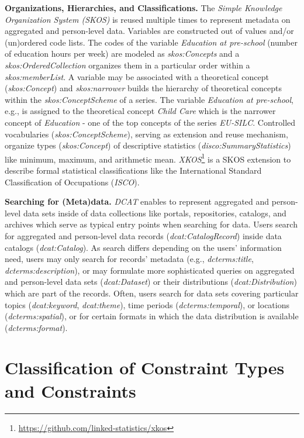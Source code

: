 \documentclass{llncs}
\begin{document}
\textbf{Organizations, Hierarchies, and Classifications.}
The \emph{Simple Knowledge Organization System (SKOS)} is reused multiple times to represent metadata on aggregated and person-level data.
Variables are constructed out of values and/or (un)ordered code lists.
The codes of the variable \emph{Education at pre-school} (number of education hours per week) are modeled as \emph{skos:Concepts} and 
a \emph{skos:OrderedCollection} organizes them in a particular order within a \emph{skos:memberList}.
A variable may be associated with a theoretical concept (\emph{skos:Concept}) and   
\emph{skos:narrower} builds the hierarchy of theoretical concepts within the \emph{skos:ConceptScheme} of a series.
The variable \emph{Education at pre-school}, e.g., is assigned to the theoretical concept \emph{Child Care} which is the narrower concept of \emph{Education} - one of the top concepts of the series \emph{EU-SILC}.
Controlled vocabularies (\emph{skos:ConceptScheme}), serving as extension and reuse mechanism,
organize types (\emph{skos:Concept}) of descriptive statistics (\emph{\emph{disco:SummaryStatistics}}) like minimum, maximum, and arithmetic mean.
\emph{XKOS}\footnote{\url{https://github.com/linked-statistics/xkos}} is a SKOS extension to describe formal statistical classifications like the International Standard Classification of Occupations (\emph{ISCO}). 

\textbf{Searching for (Meta)data.}
\emph{DCAT} enables to represent aggregated and person-level data sets inside of data collections like portals, repositories, catalogs, and archives
which serve as typical entry points when searching for data.
Users search for aggregated and person-level data records (\emph{dcat:CatalogRecord}) inside data catalogs (\emph{dcat:Catalog}). 
As search differs depending on the users’ information need,
users may only search for records' metadata (e.g., \emph{dcterms:title}, \emph{dcterms:description}), 
or may formulate more sophisticated queries on aggregated and person-level data sets (\emph{dcat:Dataset}) or their
distributions (\emph{dcat:Distribution}) which are part of the records. 
Often, users search for data sets covering particular topics (\emph{dcat:keyword}, \emph{dcat:theme}), time periods (\emph{dcterms:temporal}),  or  locations (\emph{dcterms:spatial}), 
or for certain formats in which the data distribution is available (\emph{dcterms:format}). 

\section{Classification of Constraint Types and Constraints}
\label{classification}
\end{document}
